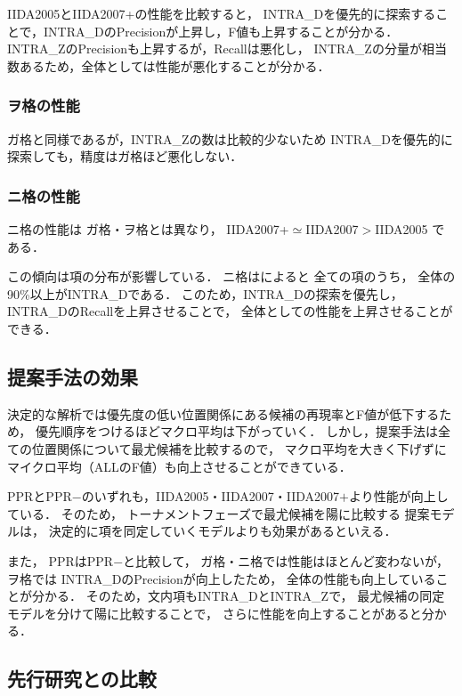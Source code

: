 \documentclass[japanese]{jnlp_1.4}
\newcommand{\tblref}[1]{}
\begin{document}
IIDA2005とIIDA2007+の性能を比較すると，
INTRA\_Dを優先的に探索することで，INTRA\_DのPrecisionが上昇し，F値も上昇することが分かる．
INTRA\_ZのPrecisionも上昇するが，Recallは悪化し，
INTRA\_Zの分量が相当数あるため，全体としては性能が悪化することが分かる．


\subsubsection{ヲ格の性能}

ガ格と同様であるが，INTRA\_Zの数は比較的少ないため
INTRA\_Dを優先的に探索しても，精度はガ格ほど悪化しない．



\subsubsection{ニ格の性能}

ニ格の性能は
ガ格・ヲ格とは異なり，
IIDA2007+$\simeq$IIDA2007$>$IIDA2005
である．

この傾向は項の分布が影響している．
ニ格は\tblref{tbl:corpus-arg-dist}によると
全ての項のうち，
全体の90\%以上がINTRA\_Dである．
このため，INTRA\_Dの探索を優先し，INTRA\_DのRecallを上昇させることで，
全体としての性能を上昇させることができる．



\subsection{提案手法の効果}

決定的な解析では優先度の低い位置関係にある候補の再現率とF値が低下するため，
優先順序をつけるほどマクロ平均は下がっていく．
しかし，提案手法は全ての位置関係について最尤候補を比較するので，
マクロ平均を大きく下げずにマイクロ平均（ALLのF値）も向上させることができている．


PPRとPPR$-$のいずれも，IIDA2005・IIDA2007・IIDA2007$+$より性能が向上している．
そのため，
トーナメントフェーズで最尤候補を陽に比較する
提案モデルは，
決定的に項を同定していくモデルよりも効果があるといえる．

また，
PPRはPPR$-$と比較して，
ガ格・ニ格では性能はほとんど変わないが，
ヲ格では
INTRA\_DのPrecisionが向上したため，
全体の性能も向上していることが分かる．
そのため，文内項もINTRA\_DとINTRA\_Zで，
最尤候補の同定モデルを分けて陽に比較することで，
さらに性能を向上することがあると分かる．


\subsection{先行研究との比較}
\label{result:prevwork}
\end{document}
